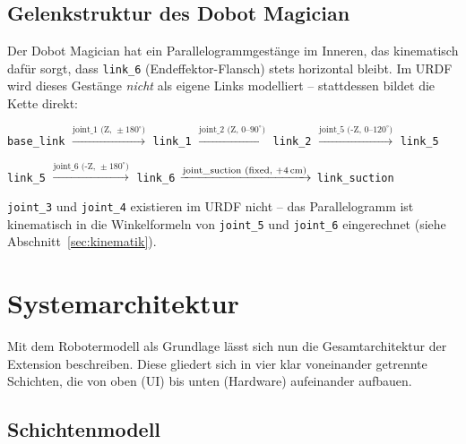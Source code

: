 \documentclass[11pt,a4paper]{article}
\begin{document}
\subsection{Gelenkstruktur des Dobot Magician}

Der Dobot Magician hat ein Parallelogrammgestänge im Inneren, das
kinematisch dafür sorgt, dass \texttt{link\_6} (Endeffektor-Flansch)
stets horizontal bleibt. Im URDF wird dieses Gestänge \emph{nicht}
als eigene Links modelliert -- stattdessen bildet die Kette direkt:

\begin{center}
\texttt{base\_link}
$\xrightarrow{\text{joint\_1 (Z, }\pm180^{\circ})}$
\texttt{link\_1}
$\xrightarrow{\text{joint\_2 (Z, 0--90}^{\circ}\text{)}}$
\texttt{link\_2}
$\xrightarrow{\text{joint\_5 (-Z, 0--120}^{\circ}\text{)}}$
\texttt{link\_5}

\texttt{link\_5}
$\xrightarrow{\text{joint\_6 (-Z, }\pm180^{\circ})}$
\texttt{link\_6}
$\xrightarrow{\text{joint\_suction (fixed, +4\,cm)}}$
\texttt{link\_suction}
\end{center}

\texttt{joint\_3} und \texttt{joint\_4} existieren im URDF nicht --
das Parallelogramm ist kinematisch in die Winkelformeln von
\texttt{joint\_5} und \texttt{joint\_6} eingerechnet
(siehe Abschnitt~\ref{sec:kinematik}).

\section{Systemarchitektur}
\label{sec:architektur}

Mit dem Robotermodell als Grundlage lässt sich nun die
Gesamtarchitektur der Extension beschreiben. Diese gliedert sich in
vier klar voneinander getrennte Schichten, die von oben (UI) bis
unten (Hardware) aufeinander aufbauen.

\subsection{Schichtenmodell}
\end{document}
